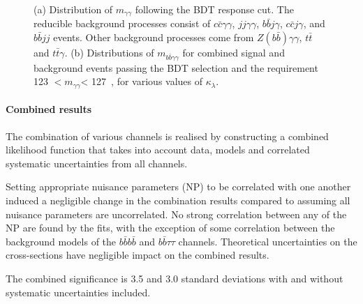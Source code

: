 

\begin{figure}[!htb]
\centering 
{} 
\caption{(a) Distribution of $m_{\gamma\gamma}$ following the BDT response cut. The reducible background processes consist of $c\bar{c}\gamma\gamma$, $jj\gamma\gamma$, $b\bar{b}j\gamma$, $c\bar{c}j\gamma$, and $b\bar{b}jj$ events.  Other background processes come from $Z(b\bar{b})\gamma\gamma$, $t\bar{t}$ and $t\bar{t}\gamma$.
(b) Distributions of $m_{b\bar{b}\gamma\gamma}$ for combined signal and background events passing the BDT selection and the requirement 123 \GeV $ < \ensuremath{m_{\gamma\gamma}} $< 127~\GeV, for various values of $\kappa_{\lambda}$.} 
\label{fig:ATLAS_HH_bbyy} 
\end{figure}


%
\paragraph{Combined results}


The combination of various channels is realised by constructing a combined likelihood function that takes into account data, models and correlated systematic uncertainties from all channels. 

Setting appropriate nuisance parameters (NP) to be correlated with one another induced a negligible change in the combination results compared to assuming all nuisance parameters are uncorrelated. No strong correlation between any of the NP are found by the fits, with the exception of some correlation between the background models of the $b\bar{b}b\bar{b}$ and $b\bar{b}\tau\tau$ channels. Theoretical uncertainties on the cross-sections have negligible impact on the combined results.

The combined significance is 3.5 and 3.0 standard deviations with and without systematic uncertainties included.

